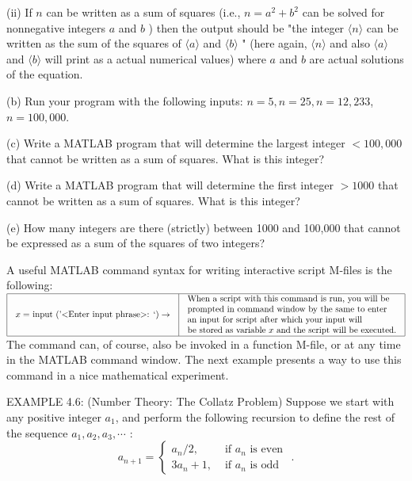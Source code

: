 \documentclass[../main.tex]{subfiles}
\begin{document}
(ii) If $n$ can be written as a sum of squares (i.e., $n=a^{2}+b^{2}$ can be solved for nonnegative integers $a$ and $b$ ) then the output should be "the integer $\langle n\rangle$ can be written as the sum of the squares of $\langle a\rangle$ and $\langle b\rangle$ " (here again, $\langle n\rangle$ and also $\langle a\rangle$ and $\langle b\rangle$ will print as a actual numerical values) where $a$ and $b$ are actual solutions of the equation.

(b) Run your program with the following inputs: $n=5, n=25, n=12,233$, $n=100,000$.

(c) Write a MATLAB program that will determine the largest integer $<100,000$ that cannot be written as a sum of squares. What is this integer?

(d) Write a MATLAB program that will determine the first integer $>1000$ that cannot be written as a sum of squares. What is this integer?

(e) How many integers are there (strictly) between 1000 and 100,000 that cannot be expressed as a sum of the squares of two integers?

A useful MATLAB command syntax for writing interactive script M-files is the following:\\

$
\begin{array}{|l|l|}
\hline \begin{array}{l}
\text {$x=$ input ('<Enter input phrase>:      `)} \rightarrow
\end{array} & \begin{array}{l}
\text {When a script with this command is run, you will be } \\
\text {prompted in command window by the same  to enter}\\
\text {an input for script after which your input will} \\
\text {be stored as variable $x$ and the script will be executed.}
\end{array} \\
\hline
\end{array}
$ \\

The command can, of course, also be invoked in a function M-file, or at any time in the MATLAB command window. The next example presents a way to use this command in a nice mathematical experiment.

EXAMPLE 4.6: (Number Theory: The Collatz Problem) Suppose we start with any positive integer $a_{1}$, and perform the following recursion to define the rest of the sequence $a_{1}, a_{2}, a_{3}, \cdots$ :
$$
a_{n+1}=\left\{\begin{array}{ll}
a_{n} / 2, & \text { if } a_{n} \text { is even } \\
3 a_{n}+1, & \text { if } a_{n} \text { is odd }
\end{array} .\right.
$$
\end{document}

